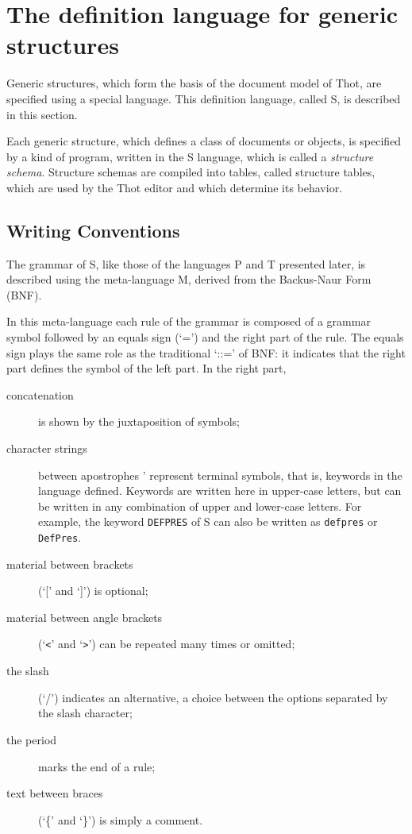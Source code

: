\section{The definition language for generic structures}

Generic structures, which form the basis of the document model of
Thot, are specified using a special language.  This definition
language, called S, is described in this section.

Each generic structure, which defines a class of documents or objects,
is specified by a kind of program, written in the S language, which is
called a {\em structure schema}.  Structure schemas are compiled into
tables, called structure tables, which are used by the Thot editor and
which determine its behavior. 

\subsection{Writing Conventions}
\label{metalang}

The grammar of S, like those of the languages P and T presented later,
is described using the meta-language M, derived from the Backus-Naur
Form (BNF).

In this meta-language each rule of the grammar is composed of a
grammar symbol followed by an equals sign (`=') and the right part of
the rule.  The equals sign plays the same role as the traditional
`::=' of BNF: it indicates that the right part defines the symbol of
the left part.  In the right part,
\begin{description}
\item[concatenation] is shown by the juxtaposition of symbols;

\item[character strings] between apostrophes ' represent terminal
symbols, that is, keywords in the language defined.  Keywords are
written here in upper-case letters, but can be written in any
combination of upper and lower-case letters.  For example, the keyword
{\tt DEFPRES} of S can also be written as {\tt defpres} or {\tt
DefPres}.

\item[material between brackets] (`[' and `]') is optional;

\item[material between angle brackets] (`\verb|<|' and `\verb|>|') can be repeated
many times or omitted;

\item[the slash] (`/') indicates an alternative, a choice between the
options separated by the slash character;

\item[the period] marks the end of a rule;

\item[text between braces] (`\{' and `\}') is simply a comment.
\end{description}

